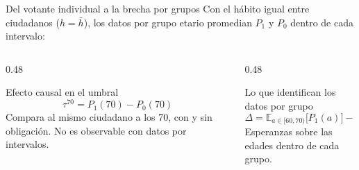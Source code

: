 \documentclass[aspectratio=169,11pt,xcolor=table]{beamer}
\begin{document}
\begin{frame}{Del votante individual a la brecha por grupos}
  \small
  Con el hábito igual entre ciudadanos ($h=\bar h$), los datos por grupo etario promedian $P_1$ y $P_0$ dentro de cada intervalo:
  \begin{columns}[T]
    \begin{column}{0.48\textwidth}
      \begin{block}{Efecto causal en el umbral}
        \footnotesize
        \[ \tau^{70}=P_1(70)-P_0(70) \]
        Compara al mismo ciudadano a los 70, con y sin obligación. No es observable con datos por intervalos.
      \end{block}
    \end{column}
    \begin{column}{0.48\textwidth}
      \begin{block}{Lo que identifican los datos por grupo}
        \footnotesize
        \[ \Delta=\mathbb E_{a\in[60,70)}\big[P_1(a)\big]-\mathbb E_{a\ge 70}\big[P_0(a)\big] \]
        Esperanzas sobre las edades dentro de cada grupo.
      \end{block}
    \end{column}
  \end{columns}
\end{frame}
\end{document}
